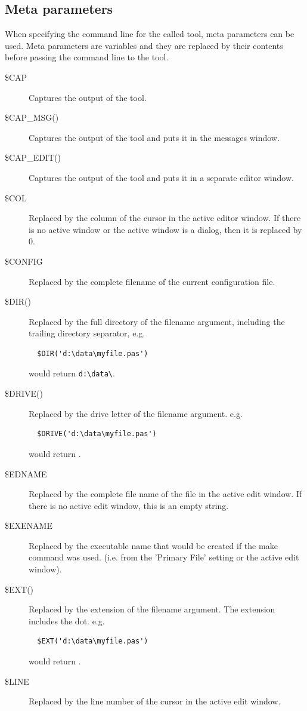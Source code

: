 \subsection{Meta parameters}
When specifying the command line for the called tool, meta parameters can
be used. Meta parameters are variables and they are replaced
by their contents before passing the command line to the tool.

\begin{description}
\item[\$CAP]
Captures the output of the tool.
\item[\$CAP\_MSG()]
Captures the output of the tool and puts it in the messages window.
\item[\$CAP\_EDIT()]
Captures the output of the tool and puts it in a separate editor window.
\item[\$COL]
Replaced by the column of the cursor in the active editor window. If there is no
 active window or the active window is a dialog, then it is replaced by 0.
\item[\$CONFIG]
Replaced by the complete filename of the current configuration file.
\item[\$DIR()]
Replaced by the full directory of the filename argument, including the trailing
directory separator, e.g.
\begin{verbatim}
  $DIR('d:\data\myfile.pas')
\end{verbatim}
would return \verb|d:\data\|.
\item[\$DRIVE()]
Replaced by the drive letter of the filename argument. e.g.
\begin{verbatim}
  $DRIVE('d:\data\myfile.pas')
\end{verbatim}
would return .
\item[\$EDNAME]
Replaced by the complete file name of the file in the active edit window.
If there is no active edit window, this is an empty string.
\item[\$EXENAME]
Replaced by the executable name that would be created if the make command
was used. (i.e. from the 'Primary File' setting or the active edit window).
\item[\$EXT()]
Replaced by the extension of the filename argument.
The extension includes the dot.
e.g.
\begin{verbatim}
  $EXT('d:\data\myfile.pas')
\end{verbatim}
would return .
\item[\$LINE]
Replaced by the line number of the cursor in the active edit window.

\end{description}

